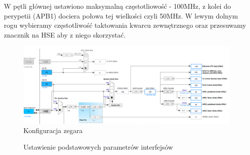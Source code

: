 \documentclass[12pt]{article}
\begin{document}
\newpage

W pętli głównej ustawiono maksymalną częstotliowość - 100MHz, z kolei do perypetii (APB1) dociera połowa tej wielkości czyli 50MHz. W lewym dolnym rogu wybieramy częstotliwość taktowania kwarcu zewnętrznego oraz przesuwamy znacznik na HSE aby z niego skorzystać.

\begin{figure}[H]
\begin{center}
\includegraphics[width=1\textwidth]{figures/zegar.png}
\caption{Konfiguracja zegara}
\end{center}
\end{figure}

\begin{figure}[H]
    \centering
    \qquad
    \caption{Ustawienie podstawowych parametrów interfejsów}%
    \label{fig:example}%
\end{figure}
\end{document}
